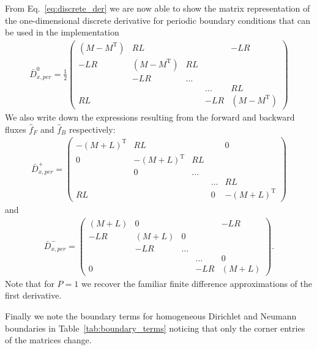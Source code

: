 From Eq.~\eqref{eq:discrete_der} we are now able to show the matrix representation of the one-dimensional discrete derivative for 
periodic boundary conditions that can be used
in the implementation
\begin{align}
    \bar D^0_{x,per} = \frac{1}{2}\begin{pmatrix}
		(M-M^{\mathrm{T}}) & RL      &    &   & -LR \\
		-LR  & (M-M^{\mathrm{T}}) & RL &   &     \\
             &  -LR    & \dots   &   &     \\
             &         &    & \dots  & RL    \\
			 RL &         &    & -LR&(M-M^{\mathrm{T}}) 
    \end{pmatrix}
    \label{eq:dxcentered}
\end{align}
We also write down the expressions resulting from the forward and backward fluxes $\hat f_F$ and $\hat f_B$ respectively:
\begin{align}
    \bar D^+_{x,per} = \begin{pmatrix}
        -(M+L)^{\mathrm{T}} & RL      &    &   & 0 \\
		 0   & -(M+L)^{\mathrm{T}} & RL &   &     \\
             &    0   & \dots   &   &     \\
             &         &    & \dots  & RL    \\
			 RL  &         &    & 0 & -(M+L)^{\mathrm{T}}
    \end{pmatrix}
    \label{eq:dxplus}
\end{align}
and 
\begin{align}
    \bar D^-_{x,per} = \begin{pmatrix}
		(M+L) & 0      &    &   & -LR \\
		-LR  & (M+L) & 0 &   &     \\
             &   -LR   & \dots   &   &     \\
             &         &    & \dots  & 0    \\
			 0  &         &    & -LR &(M+L)
    \end{pmatrix}.
    \label{eq:dxminus}
\end{align}
Note that for $P=1$ we recover the familiar finite difference approximations of the first derivative. 

Finally we note the boundary terms for homogeneous Dirichlet and Neumann boundaries
in Table~\eqref{tab:boundary_terms} noticing that only the 
corner entries of the matrices change.

